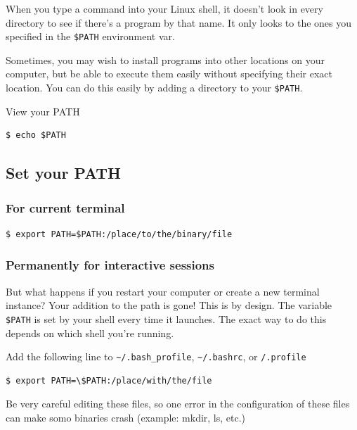 \documentclass{article}
\newenvironment{blocktemplateIII}[1]{%
    \tcolorbox[beamer,%
    noparskip,breakable,
    ,colframe=Red,%
    colbacklower=LimeGreen!75!LightGreen,%
    title=#1]}%
    {\endtcolorbox}
\newenvironment{codetemplate}[1][]{%
  \mybasecolorbox[#1]
  \itshape
}{%
  \endmybasecolorbox
}
\begin{document}
When you type a command into your Linux shell, it doesn't look in every directory to see if there's a program by that name. It only looks to the ones you specified in the \verb|$PATH| environment var.

Sometimes, you may wish to install programs into other locations on your computer, but be able to execute them easily without specifying their exact location. You can do this easily by adding a directory to your \verb|$PATH|.

View your PATH
\begin{codetemplate}{}
\begin{verbatim}
$ echo $PATH
\end{verbatim}
\end{codetemplate}

\subsection{Set your PATH}
\subsubsection{For current terminal}
\begin{codetemplate}{}
\begin{verbatim}
$ export PATH=$PATH:/place/to/the/binary/file
\end{verbatim}
\end{codetemplate}

\subsubsection{Permanently for interactive sessions}

But what happens if you restart your computer or create a new terminal instance? Your addition to the path is gone! This is by design. The variable \verb|$PATH| is set by your shell every time it launches. The exact way to do this depends on which shell you're running.

Add the following line to \verb|~/.bash_profile|, \verb|~/.bashrc|, or \verb|/.profile|

\begin{codetemplate}{}
\begin{verbatim}
$ export PATH=\$PATH:/place/with/the/file
\end{verbatim}
\end{codetemplate}

\begin{blocktemplateIII}{Nota}
Be very careful editing these files, so one error in the configuration of these files can make somo binaries crash (example: mkdir, ls, etc.)
\end{blocktemplateIII}
\end{document}
